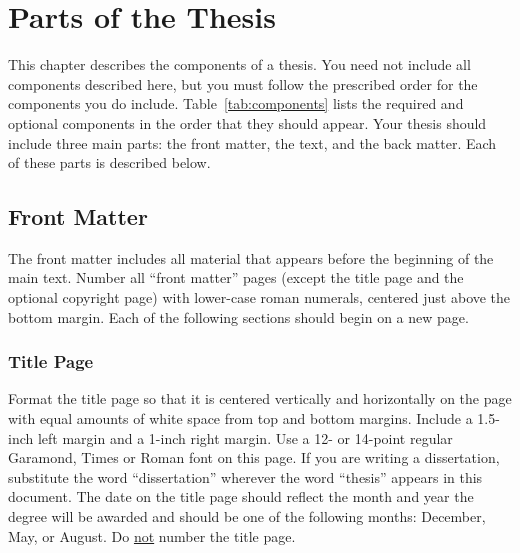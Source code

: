 %
\chapter{Parts of the Thesis}

This chapter describes the components of a thesis.  You need not include all
components described here, but you must follow the prescribed order for the
components you do include. Table~\ref{tab:components} lists the required and
optional components in the order that they should appear.  Your thesis should
include three main parts: the front matter, the text, and the back matter.
Each of these parts is described below.

\section{Front Matter}

The front matter includes all material that appears before the beginning of the
main text.  Number all ``front matter'' pages (except the title page and the
optional copyright page) with lower-case roman numerals, centered just above
the bottom margin.  Each of the following sections should begin on a new page.

\subsection{Title Page}

Format the title page so that it is centered vertically and horizontally on the
page with equal amounts of white space from top and bottom margins.  Include a
1.5-inch left margin and a 1-inch right margin.  Use a 12- or 14-point regular
Garamond, Times or Roman font on this page.  If you are writing a dissertation,
substitute the word ``dissertation'' wherever the word ``thesis'' appears in
this document.  The date on the title page should reflect the month and year
the degree will be awarded and should be one of the following months: December,
May, or August.  Do \uline{not} number the title page.

